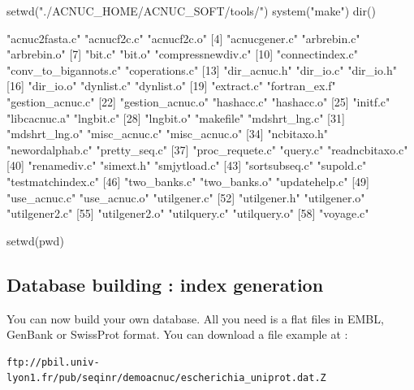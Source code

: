 \documentclass{article}
\begin{document}
\begin{itemize}
\begin{Schunk}
\begin{Sinput}
 setwd("./ACNUC_HOME/ACNUC_SOFT/tools/")
 system("make")
 dir()
\end{Sinput}
\begin{Soutput}
 [1] "acnuc2fasta.c"       "acnucf2c.c"          "acnucf2c.o"         
 [4] "acnucgener.c"        "arbrebin.c"          "arbrebin.o"         
 [7] "bit.c"               "bit.o"               "compressnewdiv.c"   
[10] "connectindex.c"      "conv_to_bigannots.c" "coperations.c"      
[13] "dir_acnuc.h"         "dir_io.c"            "dir_io.h"           
[16] "dir_io.o"            "dynlist.c"           "dynlist.o"          
[19] "extract.c"           "fortran_ex.f"        "gestion_acnuc.c"    
[22] "gestion_acnuc.o"     "hashacc.c"           "hashacc.o"          
[25] "initf.c"             "libcacnuc.a"         "lngbit.c"           
[28] "lngbit.o"            "makefile"            "mdshrt_lng.c"       
[31] "mdshrt_lng.o"        "misc_acnuc.c"        "misc_acnuc.o"       
[34] "ncbitaxo.h"          "newordalphab.c"      "pretty_seq.c"       
[37] "proc_requete.c"      "query.c"             "readncbitaxo.c"     
[40] "renamediv.c"         "simext.h"            "smjytload.c"        
[43] "sortsubseq.c"        "supold.c"            "testmatchindex.c"   
[46] "two_banks.c"         "two_banks.o"         "updatehelp.c"       
[49] "use_acnuc.c"         "use_acnuc.o"         "utilgener.c"        
[52] "utilgener.h"         "utilgener.o"         "utilgener2.c"       
[55] "utilgener2.o"        "utilquery.c"         "utilquery.o"        
[58] "voyage.c"           
\end{Soutput}
\begin{Sinput}
 setwd(pwd)
\end{Sinput}
\end{Schunk}

\end{itemize}
 
\subsection{Database building : index generation}


You can now build your own database.
All you need is a flat files
in EMBL, GenBank or SwissProt format. You can download a file example at :
\begin{verbatim}
ftp://pbil.univ-lyon1.fr/pub/seqinr/demoacnuc/escherichia_uniprot.dat.Z
\end{verbatim}
\end{document}
